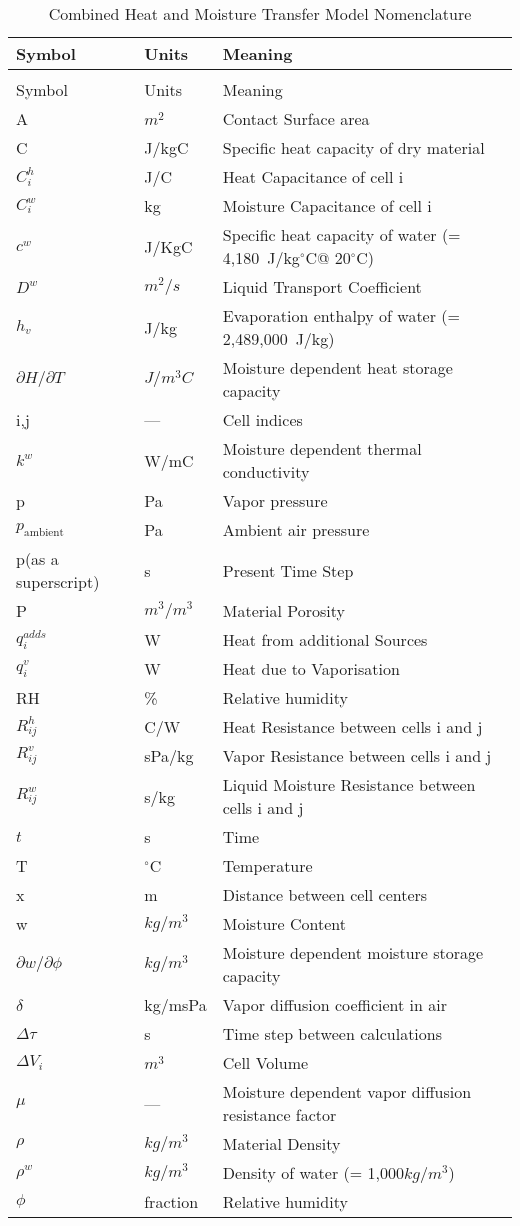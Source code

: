 \begin{longtable}[c]{p{1.5in}p{1.0in}p{3.5in}}
\caption{Combined Heat and Moisture Transfer Model Nomenclature \label{table:combined-heat-and-moisture-transfer-model}} \tabularnewline
\toprule 
Symbol & Units & Meaning \tabularnewline
\midrule
\endfirsthead

\caption[]{Combined Heat and Moisture Transfer Model Nomenclature} \tabularnewline
\toprule 
Symbol & Units & Meaning \tabularnewline
\midrule
\endhead

A & $m^2$ & Contact Surface area \tabularnewline
C & J/kgC & Specific heat capacity of dry material \tabularnewline
$C_i^h$ & J/C & Heat Capacitance of cell i \tabularnewline
$C_i^w$ & kg & Moisture Capacitance of cell i \tabularnewline
$c^{w}$ & J/KgC & Specific heat capacity of water (= 4,180~J/kg$^{\circ}$C@ 20$^{\circ}$C) \tabularnewline
${D^w}$ & $m^2/s$ & Liquid Transport Coefficient \tabularnewline
${h_v}$ & J/kg & Evaporation enthalpy of water (= 2,489,000~J/kg) \tabularnewline
$\partial{H}/\partial{T}$ & $J/m^3C$ & Moisture dependent heat storage capacity \tabularnewline
i,j & --- & Cell indices \tabularnewline
${k^w}$ & W/mC & Moisture dependent thermal conductivity \tabularnewline
p & Pa & Vapor pressure \tabularnewline
$p_{\text{ambient}}$ & Pa & Ambient air pressure \tabularnewline
p(as a superscript) & s & Present Time Step \tabularnewline
P & $m^3/m^3$ & Material Porosity \tabularnewline
${q_i^{adds}}$ & W & Heat from additional Sources \tabularnewline
${q_i^v}$ & W & Heat due to Vaporisation \tabularnewline
RH & \% & Relative humidity \tabularnewline
$R_{ij}^h$ & C/W & Heat Resistance between cells i and j \tabularnewline
$R_{ij}^v$ & sPa/kg & Vapor Resistance between cells i and j \tabularnewline
$R_{ij}^w$ & s/kg & Liquid Moisture Resistance between cells i and j \tabularnewline
$t$ & s & Time \tabularnewline
T & $^\circ$C & Temperature \tabularnewline
x & m & Distance between cell centers \tabularnewline
w & $kg/m^3$ & Moisture Content \tabularnewline
$\partial{w}/\partial{\phi}$ & $kg/m^3$ & Moisture dependent moisture storage capacity \tabularnewline
$\delta$ & kg/msPa & Vapor diffusion coefficient in air \tabularnewline
$\Delta \tau$ & s & Time step between calculations \tabularnewline
$\Delta {V_i}$ & $m^3$ & Cell Volume \tabularnewline
$\mu$ & --- & Moisture dependent vapor diffusion resistance factor \tabularnewline
$\rho$ & $kg/m^3$ & Material Density \tabularnewline
${\rho}^w$ & $kg/m^3$ & Density of water (= 1,000$kg/m^3$) \tabularnewline
$\phi$ & fraction & Relative humidity \tabularnewline
\bottomrule
\end{longtable}

